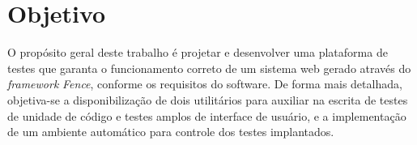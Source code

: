 \section{Objetivo}
O propósito geral deste trabalho é projetar e desenvolver uma plataforma de testes que garanta o funcionamento correto de um sistema web gerado através do \emph{framework} \emph{Fence}, conforme os requisitos do software. De forma mais detalhada, objetiva-se a disponibilização de dois utilitários para auxiliar na escrita de testes de unidade de código e testes amplos de interface de usuário, e a implementação de um ambiente automático para controle dos testes implantados.